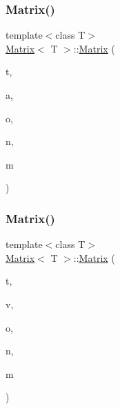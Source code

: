 \subsubsection{\texorpdfstring{Matrix()}{Matrix()}\hspace{0.1cm}{\footnotesize\ttfamily [4/7]}}
{\footnotesize\ttfamily template$<$class T$>$ \\
\mbox{\hyperlink{classMatrix}{Matrix}}$<$ T $>$\+::\mbox{\hyperlink{classMatrix}{Matrix}} (\begin{DoxyParamCaption}\item[{\mbox{\hyperlink{Array_8h_afb4b79601b9f07458ff37d2c507b3e6d_afb4b79601b9f07458ff37d2c507b3e6d}{M\+Type}}}]{t,  }\item[{const T \&}]{a,  }\item[{const T \&}]{o,  }\item[{const unsigned int}]{n,  }\item[{const unsigned int}]{m }\end{DoxyParamCaption})}

\mbox{\label{classMatrix_ab2f0cdfc1e7aac9ddd46a1c6b6a3f2f9_ab2f0cdfc1e7aac9ddd46a1c6b6a3f2f9}} 
\subsubsection{\texorpdfstring{Matrix()}{Matrix()}\hspace{0.1cm}{\footnotesize\ttfamily [5/7]}}
{\footnotesize\ttfamily template$<$class T$>$ \\
\mbox{\hyperlink{classMatrix}{Matrix}}$<$ T $>$\+::\mbox{\hyperlink{classMatrix}{Matrix}} (\begin{DoxyParamCaption}\item[{\mbox{\hyperlink{Array_8h_afb4b79601b9f07458ff37d2c507b3e6d_afb4b79601b9f07458ff37d2c507b3e6d}{M\+Type}}}]{t,  }\item[{const \mbox{\hyperlink{classVector}{Vector}}$<$ T $>$ \&}]{v,  }\item[{const T \&}]{o,  }\item[{const unsigned int}]{n,  }\item[{const unsigned int}]{m }\end{DoxyParamCaption})}

\mbox{\label{classMatrix_a33a507863c86bbc82e650054f1cc13b6_a33a507863c86bbc82e650054f1cc13b6}} 
